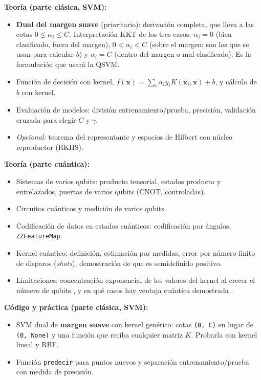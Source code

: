 \documentclass[12pt, a4paper]{article}
\begin{document}
\begin{tcolorbox}[colback=red!5!white,colframe=red!60!black,title=\textbf{Falta}]
\textbf{Teoría (parte clásica, SVM):}
\begin{itemize}
    \item \textbf{Dual del margen suave} (prioritario): derivación completa, que lleva a las cotas $0 \le \alpha_i \le C$. Interpretación KKT de los tres casos: $\alpha_i = 0$ (bien clasificado, fuera del margen), $0 < \alpha_i < C$ (sobre el margen; son los que se usan para calcular $b$) y $\alpha_i = C$ (dentro del margen o mal clasificado). Es la formulación que usará la QSVM.
    \item Función de decisión con kernel, $f(\mathbf{x}) = \sum_i \alpha_i y_i K(\mathbf{x}_i, \mathbf{x}) + b$, y cálculo de $b$ con kernel.
    \item Evaluación de modelos: división entrenamiento/prueba, precisión, validación cruzada para elegir $C$ y $\gamma$.
    \item \textit{Opcional:} teorema del representante y espacios de Hilbert con núcleo reproductor (RKHS).
\end{itemize}
\textbf{Teoría (parte cuántica):}
\begin{itemize}
    \item Sistemas de varios qubits: producto tensorial, estados producto y entrelazados, puertas de varios qubits (CNOT, controladas).
    \item Circuitos cuánticos y medición de varios qubits.
    \item Codificación de datos en estados cuánticos: codificación por ángulos, \texttt{ZZFeatureMap}.
    \item Kernel cuántico: definición, estimación por medidas, error por número finito de disparos (\textit{shots}), demostración de que es semidefinido positivo.
    \item Limitaciones: concentración exponencial de los valores del kernel al crecer el número de qubits \cite{thanasilp2024exponential}, y en qué casos hay ventaja cuántica demostrada \cite{liu2021rigorous}.
\end{itemize}
\textbf{Código y práctica (parte clásica, SVM):}
\begin{itemize}
    \item SVM dual de \textbf{margen suave} con kernel genérico: cotas \texttt{(0, C)} en lugar de \texttt{(0, None)} y una función que reciba cualquier matriz $K$. Probarla con kernel lineal y RBF.
    \item Función \texttt{predecir} para puntos nuevos y separación entrenamiento/prueba con medida de precisión.

\end{itemize}
\end{tcolorbox}
\end{document}
